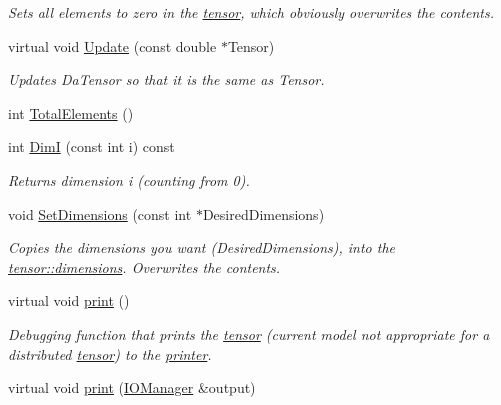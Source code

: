 \begin{DoxyCompactItemize}
\begin{DoxyCompactList}\small\item\em Sets all elements to zero in the \hyperlink{classJKBuilder_1_1tensor}{tensor}, which obviously overwrites the contents. \item\end{DoxyCompactList}\item 
virtual void \hyperlink{classJKBuilder_1_1tensor_a10ffea2bf428adfa3e8319646c44a3c6}{Update} (const double $\ast$Tensor)
\begin{DoxyCompactList}\small\item\em Updates DaTensor so that it is the same as Tensor. \item\end{DoxyCompactList}\item 
int \hyperlink{classJKBuilder_1_1tensor_a537b2f14296e2f0e62f00e1703c5fa08}{TotalElements} ()
\item 
int \hyperlink{classJKBuilder_1_1tensor_a6bdcfca6493bc217b607317dbceb28b2}{DimI} (const int i) const 
\begin{DoxyCompactList}\small\item\em Returns dimension i (counting from 0). \item\end{DoxyCompactList}\item 
void \hyperlink{classJKBuilder_1_1tensor_ace6bcf62c74395ab9e37abc4935f66e0}{SetDimensions} (const int $\ast$DesiredDimensions)
\begin{DoxyCompactList}\small\item\em Copies the dimensions you want (DesiredDimensions), into the \hyperlink{classJKBuilder_1_1tensor_a2ce1e6e0782ddee097f2c4aa2663d3e9}{tensor::dimensions}. Overwrites the contents. \item\end{DoxyCompactList}\item 
virtual void \hyperlink{classJKBuilder_1_1tensor_a388f572c62279f839ee138a9afbdeeb5}{print} ()
\begin{DoxyCompactList}\small\item\em Debugging function that prints the \hyperlink{classJKBuilder_1_1tensor}{tensor} (current model not appropriate for a distributed \hyperlink{classJKBuilder_1_1tensor}{tensor}) to the \hyperlink{classJKBuilder_1_1printer}{printer}. \item\end{DoxyCompactList}\item 
virtual void \hyperlink{classJKBuilder_1_1tensor_a74b2fe351a5444c1325870dc6162f451}{print} (\hyperlink{classJKBuilder_1_1IOManager}{IOManager} \&output)

\end{DoxyCompactItemize}
